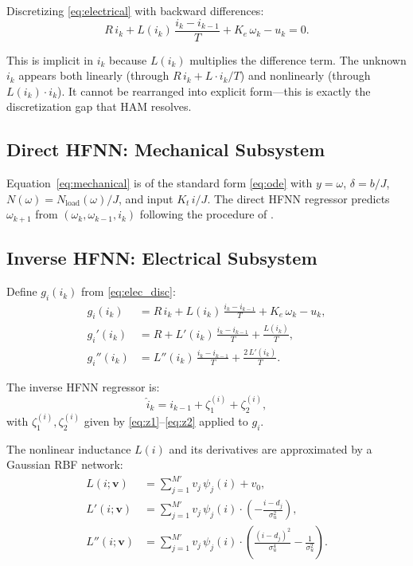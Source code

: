 \documentclass[lettersize,journal]{IEEEtran}
\begin{document}
Discretizing \eqref{eq:electrical} with backward differences:
\begin{equation}
\label{eq:elec_disc}
R\,i_k + L(i_k)\,\frac{i_k - i_{k-1}}{T} + K_e\,\omega_k - u_k = 0.
\end{equation}

This is implicit in $i_k$ because $L(i_k)$ multiplies the difference term. The unknown $i_k$ appears both linearly (through $R\,i_k + L \cdot i_k/T$) and nonlinearly (through $L(i_k) \cdot i_k$). It cannot be rearranged into explicit form---this is exactly the discretization gap that HAM resolves.

\subsection{Direct HFNN: Mechanical Subsystem}

Equation~\eqref{eq:mechanical} is of the standard form \eqref{eq:ode} with $y = \omega$, $\delta = b/J$, $N(\omega) = N_{\text{load}}(\omega)/J$, and input $K_t\,i/J$. The direct HFNN regressor predicts $\omega_{k+1}$ from $(\omega_k, \omega_{k-1}, i_k)$ following the procedure of \cite{rodrigo2025hfnn}.

\subsection{Inverse HFNN: Electrical Subsystem}

Define $g_i(i_k)$ from \eqref{eq:elec_disc}:
\begin{align}
g_i(i_k) &= R\,i_k + L(i_k)\,\frac{i_k - i_{k-1}}{T} + K_e\,\omega_k - u_k, \label{eq:gi} \\
g_i'(i_k) &= R + L'(i_k)\,\frac{i_k - i_{k-1}}{T} + \frac{L(i_k)}{T}, \label{eq:gi_prime} \\
g_i''(i_k) &= L''(i_k)\,\frac{i_k - i_{k-1}}{T} + \frac{2\,L'(i_k)}{T}. \label{eq:gi_double}
\end{align}

The inverse HFNN regressor is:
\begin{equation}
\label{eq:inverse_motor}
\hat{i}_k = i_{k-1} + \zeta_1^{(i)} + \zeta_2^{(i)},
\end{equation}
with $\zeta_1^{(i)}, \zeta_2^{(i)}$ given by \eqref{eq:z1}--\eqref{eq:z2} applied to $g_i$.

The nonlinear inductance $L(i)$ and its derivatives are approximated by a Gaussian RBF network:
\begin{align}
L(i; \mathbf{v}) &= \sum_{j=1}^{M'} v_j \, \psi_j(i) + v_0, \label{eq:rbf_L} \\
L'(i; \mathbf{v}) &= \sum_{j=1}^{M'} v_j \, \psi_j(i) \cdot \left(-\frac{i - d_j}{\sigma_u^2}\right), \label{eq:rbf_L_prime} \\
L''(i; \mathbf{v}) &= \sum_{j=1}^{M'} v_j \, \psi_j(i) \cdot \left(\frac{(i - d_j)^2}{\sigma_u^4} - \frac{1}{\sigma_u^2}\right). \label{eq:rbf_L_double}
\end{align}
\end{document}

